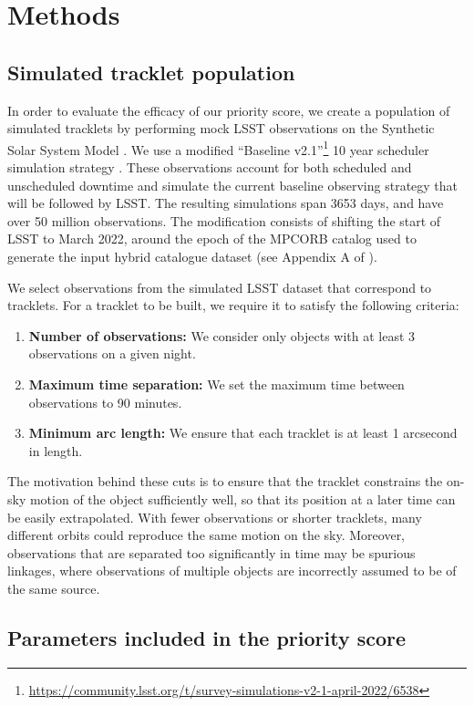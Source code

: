 \documentclass[twocolumn, twocolappendix]{aastex631}
\begin{document}
\section{Methods}

\subsection{Simulated tracklet population}

In order to evaluate the efficacy of our priority score, we create a population of simulated tracklets by performing mock LSST observations on the Synthetic Solar System Model \citep{Grav+2011}. We use a modified ``Baseline v2.1''\footnote{\url{https://community.lsst.org/t/survey-simulations-v2-1-april-2022/6538}} 10 year scheduler simulation strategy \citep{Naghib+2019, Cornwall+2020}. These observations account for both scheduled and unscheduled downtime and simulate the current baseline observing strategy that will be followed by LSST. The resulting simulations span 3653 days, and have over 50 million observations. The modification consists of shifting the start of LSST to March 2022, around the epoch of the MPCORB catalog used to generate the input hybrid catalogue dataset (see Appendix A of \citealp{sky-is-falling}).

We select observations from the simulated LSST dataset that correspond to tracklets. For a tracklet to be built, we require it to satisfy the following criteria:
\begin{enumerate}
    \item \textbf{Number of observations:} We consider only objects with at least 3 observations on a given night.
    \item \textbf{Maximum time separation:} We set the maximum time between observations to 90 minutes.
    \item \textbf{Minimum arc length:} We ensure that each tracklet is at least 1 arcsecond in length.
\end{enumerate}
The motivation behind these cuts is to ensure that the tracklet constrains the on-sky motion of the object sufficiently well, so that its position at a later time can be easily extrapolated. With fewer observations or shorter tracklets, many different orbits could reproduce the same motion on the sky. Moreover, observations that are separated too significantly in time may be spurious linkages, where observations of multiple objects are incorrectly assumed to be of the same source.

\subsection{Parameters included in the priority score}
\end{document}
